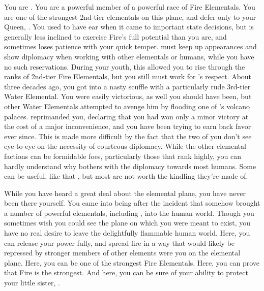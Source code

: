 \documentclass[char]{elementals}
\begin{document}
\name{\cPyro{}}

You are \cPyro{\intro}.  You are a powerful member of a powerful race of Fire Elementals.  You are one of the strongest 2nd-tier elementals on this plane, and defer only to your Queen, \cQueen{\intro}.  You used to have \cQueen{\their} ear when it came to important state decisions, but \cQueen{\they} is generally less inclined to exercise Fire's full potential than you are, and sometimes loses patience with your quick temper.  \cQueen{\They} must keep up appearances and show diplomacy when working with other elementals or humans, while you have no such reservations.  During your youth, this allowed you to rise through the ranks of 2nd-tier Fire Elementals, but you still must work for \cQueen{}'s respect.  About three decades ago, you got into a nasty scuffle with a particularly rude 3rd-tier Water Elemental.  You were easily victorious, as well you should have been, but other Water Elementals attempted to avenge him by flooding one of \cQueen{}'s volcano palaces.  \cQueen{} reprimanded you, declaring that you had won only a minor victory at the cost of a major inconvenience, and you have been trying to earn back \cQueen{\their} favor ever since.  This is made more difficult by the fact that the two of you don't see eye-to-eye on the necessity of courteous diplomacy.  While the other elemental factions can be formidable foes, particularly those that rank highly, you can hardly understand why \cQueen{} bothers with the diplomacy towards most humans.  Some can be useful, like that \cDema{\intro}, but most are not worth the kindling they're made of.

While you have heard a great deal about the elemental plane, you have never been there yourself.  You came into being after the incident that somehow brought a number of powerful elementals, including \cQueen{}, into the human world.  Though you sometimes wish you could see the plane on which you were meant to exist, you have no real desire to leave the delightfully flammable human world.  Here, you can release your power fully, and spread fire in a way that would likely be repressed by stronger members of other elements were you on the elemental plane.  Here, you can be one of the strongest Fire Elementals.  Here, you can prove that Fire is the strongest.  And here, you can be sure of your ability to protect your little sister, \cJuliet{\intro}.
\end{document}
